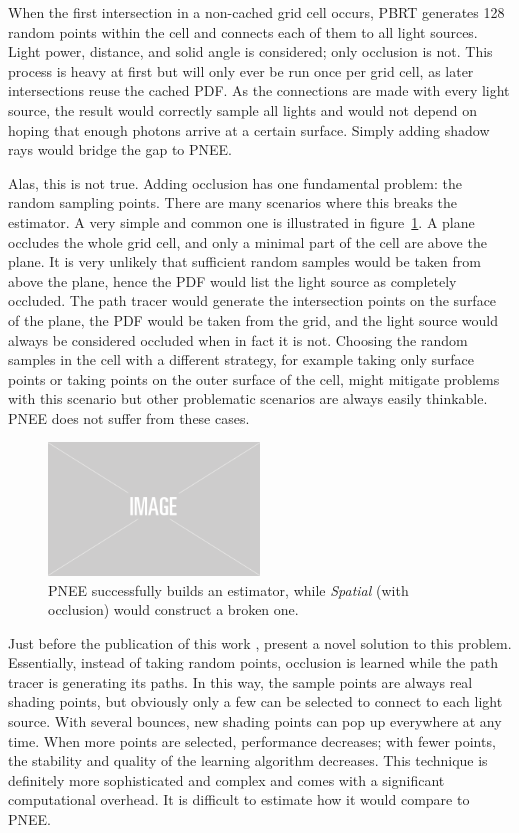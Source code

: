 When the first intersection in a non-cached grid cell occurs, PBRT generates 128 random points within the cell and connects each of them to all light sources. Light power, distance, and solid angle is considered; only occlusion is not. This process is heavy at first but will only ever be run once per grid cell, as later intersections reuse the cached PDF. As the connections are made with every light source, the result would correctly sample all lights and would not depend on hoping that enough photons arrive at a certain surface. Simply adding shadow rays would bridge the gap to PNEE.

Alas, this is not true. Adding occlusion has one fundamental problem: the random sampling points. There are many scenarios where this breaks the estimator. A very simple and common one is illustrated in figure~\ref{fig:pbrtoccl}. A plane occludes the whole grid cell, and only a minimal part of the cell are above the plane. It is very unlikely that sufficient random samples would be taken from above the plane, hence the PDF would list the light source as completely occluded. The path tracer would generate the intersection points on the surface of the plane, the PDF would be taken from the grid, and the light source would always be considered occluded when in fact it is not. Choosing the random samples in the cell with a different strategy, for example taking only surface points or taking points on the outer surface of the cell, might mitigate problems with this scenario but other problematic scenarios are always easily thinkable. PNEE does not suffer from these cases.

\begin{figure}
    \centering
    \includegraphics[width=0.5\textwidth]{figures/img-placeholder.png}
    \caption{PNEE successfully builds an estimator, while \textit{Spatial} (with occlusion) would construct a broken one.}
    \label{fig:pbrtoccl}
\end{figure}

Just before the publication of this work \textcite{Vevoda:2018:BOR}, present a novel solution to this problem. Essentially, instead of taking random points, occlusion is learned while the path tracer is generating its paths. In this way, the sample points are always real shading points, but obviously only a few can be selected to connect to each light source. With several bounces, new shading points can pop up everywhere at any time. When more points are selected, performance decreases; with fewer points, the stability and quality of the learning algorithm decreases. This technique is definitely more sophisticated and complex and comes with a significant computational overhead. It is difficult to estimate how it would compare to PNEE.